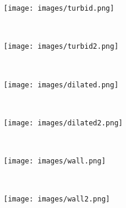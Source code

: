 \documentclass[review,12pt,3p]{elsarticle}
\begin{document}
\begin{figure}
        \begin{subfigure}[b]{0.08\textwidth}
                \texttt{[image: images/turbid.png]}
                \caption{}
        \end{subfigure}%
        ~ 
        \begin{subfigure}[b]{0.08\textwidth}
                \texttt{[image: images/turbid2.png]}
                \caption{}
        \end{subfigure}
        ~
        \begin{subfigure}[b]{0.08\textwidth}
                \texttt{[image: images/dilated.png]}
                \caption{}
        \end{subfigure}
        ~
        \begin{subfigure}[b]{0.08\textwidth}
                \texttt{[image: images/dilated2.png]}
                \caption{}
        \end{subfigure}
        ~
        \begin{subfigure}[b]{0.08\textwidth}
                \texttt{[image: images/wall.png]}
                \caption{}
        \end{subfigure}
        ~
        \begin{subfigure}[b]{0.08\textwidth}
                \texttt{[image: images/wall2.png]}
                \caption{}
        \end{subfigure}
        

\end{figure}
\end{document}
